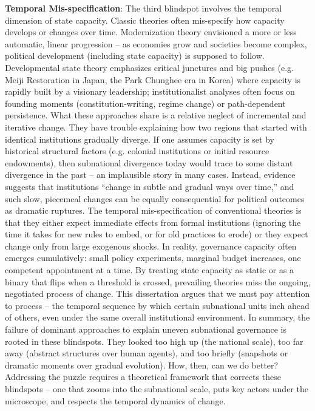 \textbf{Temporal Mis-specification}: The third blindspot involves the temporal dimension of state capacity.
Classic theories often mis-specify how capacity develops or changes over time. Modernization theory
envisioned a more or less automatic, linear progression – as economies grow and societies become
complex, political development (including state capacity) is supposed to follow. Developmental state
theory emphasizes critical junctures and big pushes (e.g. Meiji Restoration in Japan, the Park Chunghee
era in Korea) where capacity is rapidly built by a visionary leadership; institutionalist analyses often
focus on founding moments (constitution-writing, regime change) or path-dependent persistence. What
these approaches share is a relative neglect of incremental and iterative change. They have trouble
explaining how two regions that started with identical institutions gradually diverge. If one assumes
capacity is set by historical structural factors (e.g. colonial institutions or initial resource endowments),
then subnational divergence today would trace to some distant divergence in the past – an implausible
story in many cases. Instead, evidence suggests that institutions “change in subtle and gradual ways over
time,” and such slow, piecemeal changes can be equally consequential for political outcomes as dramatic
ruptures. The temporal mis-specification of conventional theories is that they either expect immediate
effects from formal institutions (ignoring the time it takes for new rules to embed, or for old practices
to erode) or they expect change only from large exogenous shocks. In reality, governance capacity often
emerges cumulatively: small policy experiments, marginal budget increases, one competent appointment
at a time. By treating state capacity as static or as a binary that flips when a threshold is crossed,
prevailing theories miss the ongoing, negotiated process of change. This dissertation argues that we must
pay attention to process – the temporal sequence by which certain subnational units inch ahead of others,
even under the same overall institutional environment.
In summary, the failure of dominant approaches to explain uneven subnational governance is rooted in
these blindspots. They looked too high up (the national scale), too far away (abstract structures over
human agents), and too briefly (snapshots or dramatic moments over gradual evolution). How, then, can
we do better? Addressing the puzzle requires a theoretical framework that corrects these blindspots –
one that zooms into the subnational scale, puts key actors under the microscope, and respects the
temporal dynamics of change.

